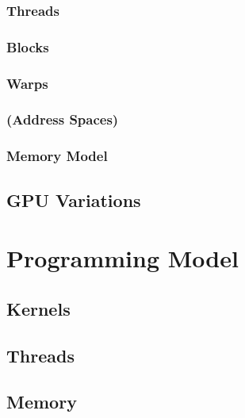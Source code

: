 \documentclass[12px,oz]{report}
\theoremstyle{indented}
\begin{document}
		\subsection{Threads}
		\label{sec:HW-Threads}
		

		\subsection{Blocks}
		\label{sec-hw-blocks}
		

		\subsection{Warps}
		\label{sec-hw-warps}
		

		\subsection{(Address Spaces)}

		\subsection{Memory Model}
		\label{sec-hw-memory-model}
		

	\section{GPU Variations}
	\label{sec-hw-variations}
	


\chapter{Programming Model}
\label{ch-programming-model}


	\section{Kernels}
	\label{sec-pm-kernels}
	

	\section{Threads}
	\label{sec-pm-threads}
	
	
	\section{Memory}
	\label{sec-pm-memory}
	
	
\end{document}
